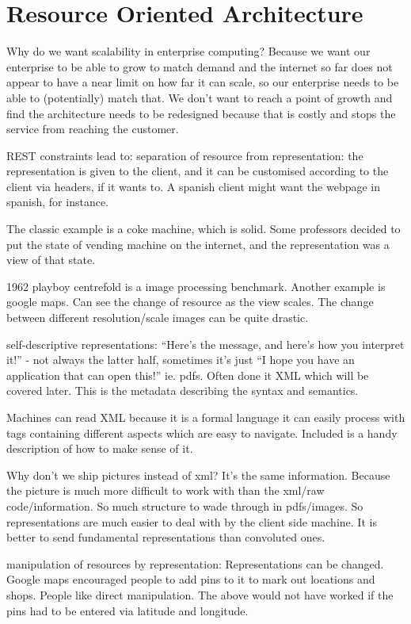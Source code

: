 \documentclass[11pt]{article}
\begin{document}
\section{Resource Oriented Architecture}

Why do we want scalability in enterprise computing? Because we want our enterprise to be able to grow to match demand and the internet so far does not appear to have a near limit on how far it can scale, so our enterprise needs to be able to (potentially) match that. We don’t want to reach a point of growth and find the architecture needs to be redesigned because that is costly and stops the service from reaching the customer.

REST constraints lead to:
separation of resource from representation: the representation is given to the client, and it can be customised according to the client via headers, if it wants to. A spanish client might want the webpage in spanish, for instance.

The classic example is a coke machine, which is solid. Some professors decided to put the state of vending machine on the internet, and the representation was a view of that state.

1962 playboy centrefold is a image processing benchmark. Another example is google maps. Can see the change of resource as the view scales. The change between different resolution/scale images can be quite drastic.

self-descriptive representations: “Here’s the message, and here’s how you interpret it!” - not always the latter half, sometimes it’s just “I hope you have an application that can open this!” ie. pdfs. Often done it XML which will be covered later. This is the metadata describing the syntax and semantics. 

Machines can read XML because it is a formal language it can easily process with tags containing different aspects which are easy to navigate. Included is a handy description of how to make sense of it.

Why don’t we ship pictures instead of xml? It’s the same information. Because the picture is much more difficult to work with than the xml/raw code/information. So much structure to wade through in pdfs/images. So representations are much easier to deal with by the client side machine. It is better to send fundamental representations than convoluted ones.

manipulation of resources by representation: Representations can be changed. Google maps encouraged people to add pins to it to mark out locations and shops. People like direct manipulation. The above would not have worked if the pins had to be entered via latitude and longitude.
\end{document}
